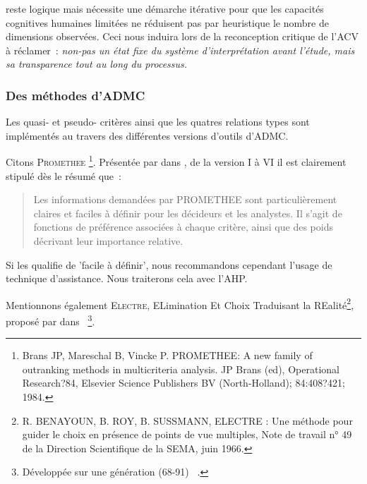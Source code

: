 reste logique mais nécessite une démarche itérative pour que les capacités cognitives humaines limitées ne réduisent pas par heuristique le nombre de dimensions observées.
Ceci nous induira lors de la reconception critique de l'ACV à réclamer~: \emph{non-pas un état fixe du système d'interprétation avant l'étude, mais sa transparence tout au long du processus.}

\subsubsection{Des méthodes d'\gls{ADMC}}
Les quasi- et pseudo- critères ainsi que les quatres relations types sont implémentés au travers des différentes versions d'outils d'\gls{ADMC}.

Citons \textsc{Promethee}
 \footnote{Brans JP, Mareschal B, Vincke P. PROMETHEE: A new family of outranking methods in multicriteria analysis. JP Brans (ed), Operational Research?84, Elsevier Science Publishers BV (North-Holland); 84:408?421; 1984.}.
Présentée par \citeauthor{deshmukh_preference_2013} dans , de la version I à VI il est clairement stipulé dès le résumé que~:
\blockcquote[traduction]{deshmukh_preference_2013}{
Les informations demandées par PROMETHEE sont particulièrement claires et faciles à définir pour les décideurs et les analystes.
Il s'agit de fonctions de préférence associées à chaque critère, ainsi que des poids décrivant leur importance relative.
}
Si \citeauthor{deshmukh_preference_2013} les qualifie de 'facile à définir', nous recommandons cependant l'usage de technique d'assistance.
Nous traiterons cela avec l'\acrshort{AHP}.

Mentionnons également \textsc{Electre}, ELimination Et Choix Traduisant la REalité\footnote{R. BENAYOUN, B. ROY, B. SUSSMANN, ELECTRE
: Une méthode pour guider le choix en présence de points de vue multiples, Note de travail n° 49 de la Direction Scientifique de la SEMA, juin 1966.},
proposé par \citeauthor{roy_classement_1968} dans ~\cite{roy_classement_1968}\footnote{
Développée sur une génération (68-91) ~\cite{roy_outranking_1991}.}.

